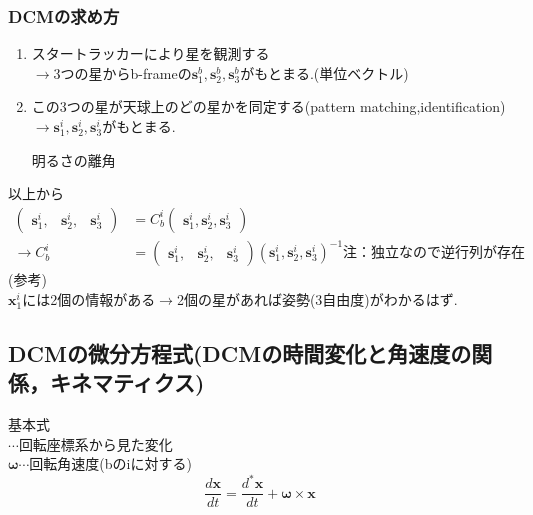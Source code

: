 \documentclass[class=article, crop=false, dvipdfmx, fleqn]{standalone}
\begin{document}
\subsubsection{DCMの求め方}
\begin{enumerate}[label = \maru{\theenumi}]
\item スタートラッカーにより星を観測する\\
$\rightarrow$3つの星からb-frameの$\bm{s}^b_1,\bm{s}^b_2,\bm{s}^b_3$がもとまる.(単位ベクトル)
\item この3つの星が天球上のどの星かを同定する(pattern matching,identification)\\
$\rightarrow\bm{s}^i_1,\bm{s}^i_2,\bm{s}^i_3$がもとまる.
\hfil
\begin{minipage}{2.3cm}
\begin{figure}[H]
\end{figure}
\end{minipage}
明るさの離角
\end{enumerate}

以上から
\begin{align}
\begin{pmatrix}
	\bm{s}^i_1, & \bm{s}^i_2, & \bm{s}^i_3
\end{pmatrix}
& = 
C^i_b
\begin{pmatrix}
	\bm{s}^i_1,\bm{s}^i_2,\bm{s}^i_3
\end{pmatrix}
\\
\rightarrow 
C^i_b & = 
\begin{pmatrix}
\bm{s}^i_1, & \bm{s}^i_2, & \bm{s}^i_3
\end{pmatrix}
\left( \bm{s}^i_1,\bm{s}^i_2,\bm{s}^i_3 \right)^{-1}\mbox{注：独立なので逆行列が存在}
\end{align}
(参考)\\
$\bm{x}^i_1$には2個の情報がある$\rightarrow$2個の星があれば姿勢(3自由度)がわかるはず.


\subsection{DCMの微分方程式(DCMの時間変化と角速度の関係，キネマティクス)}
\noindent
{} 基本式\\
\text{*}$\cdots$回転座標系から見た変化\\
$\bm{\omega}\cdots$回転角速度(bのiに対する)
\[ \frac{d\bm{x}}{dt}=\frac{d^*\bm{x}}{dt}+\bm{\omega}\times\bm{x} \]
\end{document}
